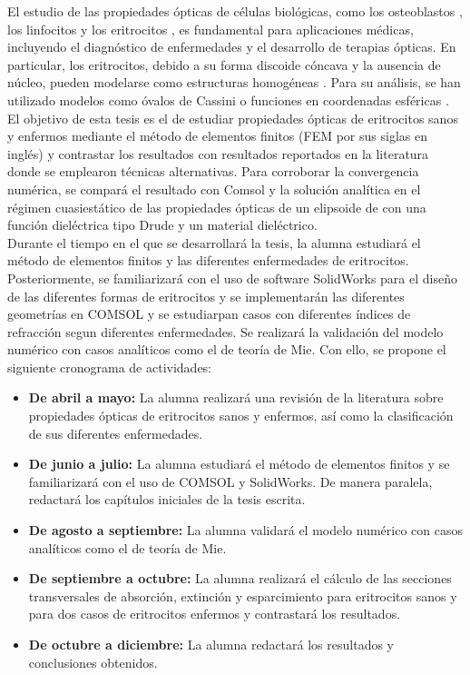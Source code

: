 \documentclass[9pt,letterpaper]{article}
\begin{document}
	
	El estudio de las propiedades ópticas de células biológicas, como los osteoblastos \cite{Osteoblastos}, los linfocitos \cite{Linfocitos} y los eritrocitos \cite{Blood}, es fundamental para aplicaciones médicas, incluyendo el diagnóstico de enfermedades y el desarrollo de terapias ópticas. En particular, los eritrocitos, debido a su forma discoide cóncava y la ausencia de núcleo, pueden modelarse como estructuras homogéneas \cite{Cassini}. Para su análisis, se han utilizado modelos como óvalos de Cassini \cite{Cassini} o funciones en coordenadas esféricas \cite{Esferico}. El objetivo de esta tesis es el de estudiar propiedades ópticas de eritrocitos sanos y enfermos mediante el método de elementos finitos (FEM por sus siglas en inglés) y contrastar los resultados con resultados reportados en la literatura donde se emplearon técnicas alternativas. Para corroborar la convergencia numérica, se compará el resultado con Comsol y la solución analítica en el régimen cuasiestático de las propiedades ópticas de un elipsoide de con una función dieléctrica tipo Drude y un material dieléctrico.\\
	
	Durante el tiempo en el que se desarrollará la tesis, la alumna estudiará el método de elementos finitos y las diferentes enfermedades de eritrocitos. Posteriormente, se familiarizará con el uso de software SolidWorks para el diseño de las diferentes formas de eritrocitos y se implementarán las diferentes geometrías en COMSOL y se estudiarpan casos con diferentes índices de refracción segun diferentes enfermedades. Se realizará la validación del modelo numérico con casos analíticos como el de teoría de Mie. Con ello, se propone el siguiente cronograma de actividades:
	\begin{itemize}
		\item \textbf{De abril a mayo:} La alumna realizará una revisión de la literatura sobre propiedades ópticas de eritrocitos sanos y enfermos, así como la clasificación de sus diferentes enfermedades. 
		\item \textbf{De junio a julio:} La alumna estudiará el método de elementos finitos y se familiarizará con el uso de COMSOL y SolidWorks. De manera paralela, redactará los capítulos iniciales de la tesis escrita.
		\item \textbf{De agosto a septiembre:} La alumna validará el modelo numérico con casos analíticos como el de teoría de Mie.
		\item \textbf{De septiembre a octubre:} La alumna realizará el cálculo de las secciones transversales de absorción, extinción y esparcimiento para eritrocitos sanos y para dos casos de eritrocitos enfermos y contrastará los resultados.
		\item \textbf{De octubre a diciembre:} La alumna redactará los resultados y conclusiones obtenidos.
	\end{itemize}
	
\end{document}
